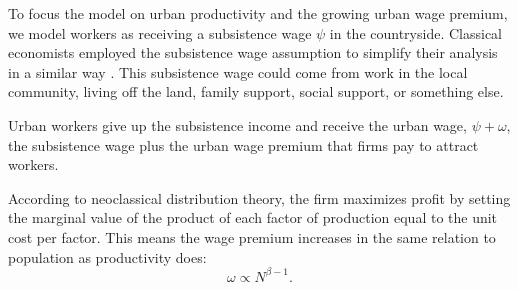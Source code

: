 To focus the model on urban productivity and the growing urban wage premium, we model workers as receiving a \gls{subsistence wage} $\psi$ in the countryside. Classical economists employed the \gls{subsistence wage} assumption to simplify their analysis in a similar way \cite{GET_classical-subsistence-wage}.
%
This subsistence wage could come from work in the local community, living off the land, family support, social support, or something else. 

Urban workers give up the subsistence income and receive the \gls{urban wage}, $\psi +  \omega$, the subsistence wage plus the \gls{urban wage premium} that firms pay to attract workers. 


According to \gls{neoclassical distribution theory}, the firm maximizes profit by setting the marginal value of the product of each \gls{factor of production} equal to the unit cost per factor. This means the wage premium increases in the same relation to population as \gls{productivity} does:
\begin{equation}
\omega\propto N^{\beta-1}.
\label{eqn-wage-population}
\end{equation}

